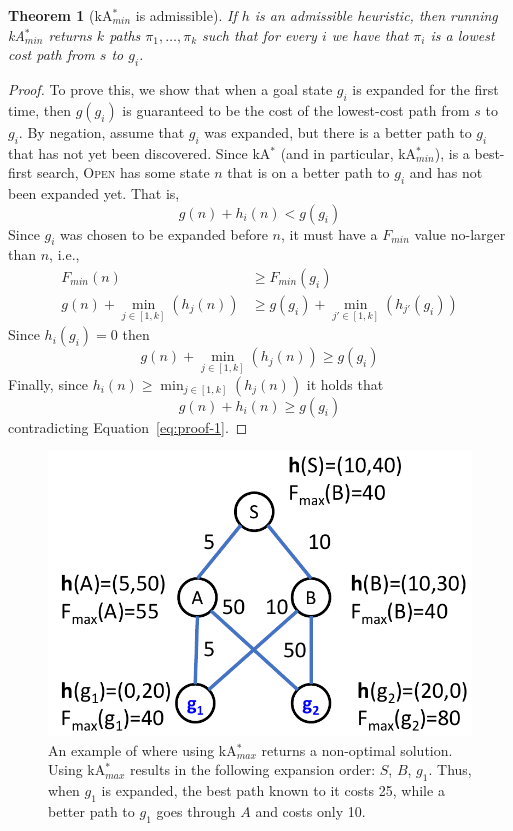 \documentclass{aicom2e}
\newtheorem{theorem}{Theorem}
\newcommand{\kastar}{kA$^*$}
\newcommand{\kastarmin}{kA$^*_{min}$}
\newcommand{\kastarmax}{kA$^*_{max}$}
\newcommand{\open}{\textsc{Open}}
\begin{document}

\begin{theorem}[\kastarmin{} is admissible]
If $h$ is an admissible heuristic, then running \kastarmin{} returns $k$ paths
$\pi_1,\ldots, \pi_k$ such that for every $i$ we have that $\pi_i$ is a lowest cost
path from $s$ to $g_i$. \label{the:min-f}
\end{theorem}
 \begin{proof}
To prove this, we show that when a goal state $g_i$ is expanded for the first
time, then $g(g_i)$ is guaranteed to be the cost of the lowest-cost path from
$s$ to $g_i$. By negation, assume that $g_i$ was expanded, but there is
a better path to $g_i$ that has not yet been discovered. Since \kastar{} (and
in particular, \kastarmin), is a best-first search, \open{} has some state $n$
that is on a better path to $g_i$ and has not been expanded yet. That is,
\begin{equation}
g(n)+h_i(n)<g(g_i)
\label{eq:proof-1}
\end{equation}
Since $g_i$ was chosen to be expanded before $n$, it must have a $F_{min}$ value no-larger than $n$, i.e.,
\begin{align}
F_{min}(n) &\geq  F_{min}(g_i) \\
g(n)+\min_{j\in [1,k]}(h_j(n))& \geq  g(g_i)+\min_{j'\in [1,k]}(h_{j'}(g_i))
\end{align}
Since $h_i(g_i)=0$ then
\[ g(n)+\min_{j\in [1,k]}(h_j(n)) \geq  g(g_i) \]
Finally, since $h_i(n)\geq \min_{j\in [1,k]}(h_j(n))$ it holds that
\[ g(n)+h_i(n) \geq  g(g_i) \]
contradicting Equation~\ref{eq:proof-1}.
\end{proof}



\begin{figure}
 \includegraphics[width=0.85\columnwidth]{max-bad_cropped.pdf}
 \caption{An example of where using \kastarmax{} returns a non-optimal solution. Using \kastarmax{} results in the following expansion order: $S$, $B$, $g_1$.
 Thus, when $g_1$ is expanded, the best path known to it costs 25, while a
 better path to $g_1$ goes through $A$ and costs only 10.}
 \label{fig:max-bad}
 \end{figure}
\end{document}
